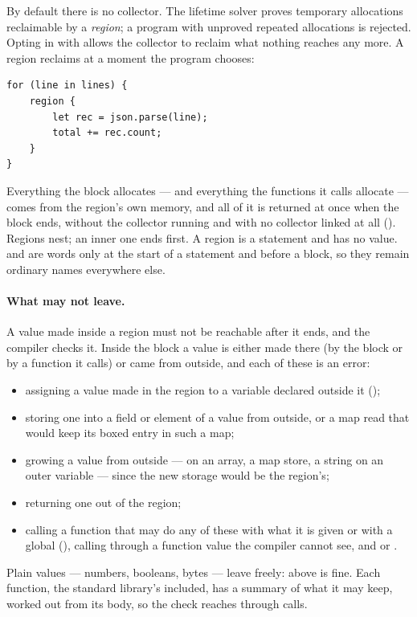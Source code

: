 By default there is no collector. The lifetime solver proves temporary
allocations reclaimable by a \emph{region}; a program with unproved repeated
allocations is rejected. Opting in with  allows the collector
to reclaim what nothing reaches any more. A region reclaims at a moment the
program chooses:

\begin{verbatim}
for (line in lines) {
    region {
        let rec = json.parse(line);
        total += rec.count;
    }
}
\end{verbatim}

\noindent Everything the block allocates --- and everything the functions it
calls allocate --- comes from the region's own memory, and all of it is
returned at once when the block ends, without the collector running and with
no collector linked at all (). Regions nest; an inner one ends
first. A region is a statement and has no value.  and 
are words only at the start of a statement and before a block, so they remain
ordinary names everywhere else.

\paragraph{What may not leave.} A value made inside a region must not be
reachable after it ends, and the compiler checks it. Inside the block a value
is either made there (by the block or by a function it calls) or came from
outside, and each of these is an error:
\begin{itemize}
\item assigning a value made in the region to a variable declared outside it
  ();
\item storing one into a field or element of a value from outside, or a map
  read that would keep its boxed entry in such a map;
\item growing a value from outside --- \ic{+=} on an array, a map store, a
  string \ic{+=} on an outer variable --- since the new storage would be the
  region's;
\item returning one out of the region;
\item calling a function that may do any of these with what it is given or
  with a global (), calling through a function value the compiler cannot see, and
   or .
\end{itemize}
Plain values --- numbers, booleans, bytes --- leave freely:  above is fine. Each function, the standard library's included, has
a summary of what it may keep, worked out from its body, so the check reaches
through calls.

